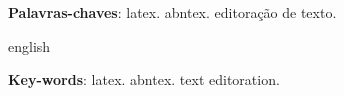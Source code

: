 
\begin{resumo}

\lipsum[1-1]

 \vspace{\onelineskip}
    
 \noindent
 \textbf{Palavras-chaves}: latex. abntex. editoração de texto.
\end{resumo}

\begin{resumo}[Abstract]
 	\begin{otherlanguage*}{english}
	\textit{
	\lipsum[1-1]
	} 
    \vspace{\onelineskip}
 
    \noindent 
    \textbf{Key-words}: latex. abntex. text editoration.	
 	\end{otherlanguage*}
\end{resumo}